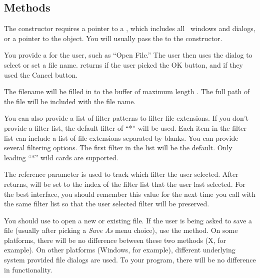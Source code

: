 \subsection* {Methods}


The  constructor requires a pointer to a
, which includes all \V\ windows and dialogs,
or a pointer to the  object.
You will usually pass the  to the constructor.



You provide a  for the user, such as ``Open File.'' The
user then uses the dialog to select or set a file name. 
returns  if the user picked the OK button, and 
if they used the Cancel button.

The filename will be filled in to the  buffer of
maximum length . The full path of the file will be
included with the file name.

You can also provide a list of filter patterns to filter file
extensions. If you don't provide a filter list, the default filter
of ``*'' will be used. Each item in the filter list can include a list
of file extensions separated by blanks. You can provide several
filtering options. The first filter in the list will be the default.
Only leading ``*'' wild cards are supported.

The  reference parameter is used to track which
filter the user selected. After  returns, 
will be set to the index of the filter list that the user last
selected. For the best interface, you should remember this value for
the next time you call  with the same filter list so
that the user selected filter will be preserved.

You should use  to open a new or existing file. If
the user is being asked to save a file (usually after picking a
\emph{Save As} menu choice), use the  method. On
some platforms, there will be no difference between these two
methods (X, for example). On other platforms (Windows, for example),
different underlying system provided file dialogs are used. To your
program, there will be no difference in functionality.

